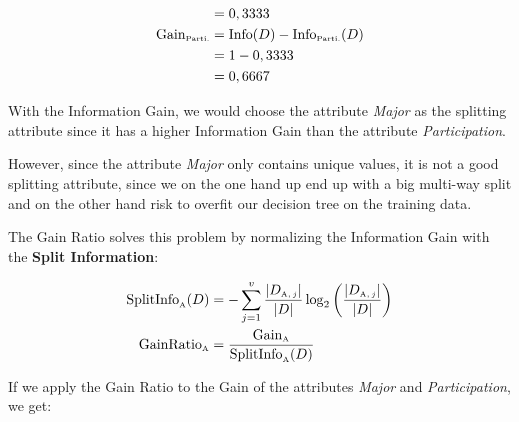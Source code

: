 \documentclass[
english,
smallborders
]{i6prcsht}
\newcommand{\OfAttribute}[1]{_{\text{\tiny #1}}}
\begin{document}
\begin{solution}
\begin{alignat*}{3}
		                                   & =  0,3333                                                                                                                                                                                                                                         \\
		\text{Gain}\OfAttribute{Parti.}    & = \text{Info}(D) - \text{Info}\OfAttribute{Parti.}(D)                                                                                                                                                                                             \\
		                                   & = 1 - 0,3333                                                                                                                                                                                                                                      \\
		                                   & = 0,6667                                                                                                                                                                                                                                          \\
	\end{alignat*}
	
	With the Information Gain, we would choose the attribute \textit{Major} as the splitting attribute since it has a higher Information Gain than the attribute \textit{Participation}.
	
	However, since the attribute \textit{Major} only contains unique values, it is not a good splitting attribute, since we on the one hand up end up with a big multi-way split and on the other hand risk to overfit our decision tree on the training data.
	
	The Gain Ratio solves this problem by normalizing the Information Gain with the \textbf{Split Information}:
	
	\begin{alignat*}{2}
		\text{SplitInfo}\OfAttribute{A}(D) & = -\sum_{j=1}^{v} \frac{|D\OfAttribute{A$,j$}|}{|D|} \log_2\left(\frac{|D\OfAttribute{A$,j$}|}{|D|}\right) \\
		\text{GainRatio}\OfAttribute{A}    & = \frac{\text{Gain}\OfAttribute{A}}{\text{SplitInfo}\OfAttribute{A}(D)}
	\end{alignat*}
	
	If we apply the Gain Ratio to the Gain of the attributes \textit{Major} and \textit{Participation}, we get:
	

\end{solution}
\end{document}
